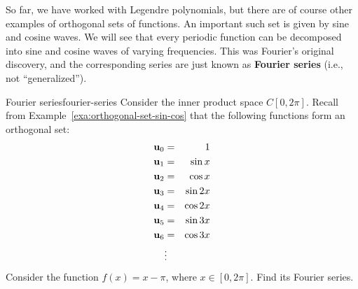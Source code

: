 So far, we have worked with Legendre polynomials, but there are of
course other examples of orthogonal sets of functions. An important
such set is given by sine and cosine waves. We will see that every
periodic function can be decomposed into sine and cosine waves of
varying frequencies. This was Fourier's original discovery, and the
corresponding series are just known as \textbf{Fourier series}%
%
 (i.e., not ``generalized'').

\begin{example}{Fourier series}{fourier-series}
  Consider the inner product space $C[0,2\pi]$. Recall from
  Example~\ref{exa:orthogonal-set-sin-cos} that the following
  functions form an orthogonal set:
  \begin{eqnarray*}
    \vect{u}_0 &=& 1 \\
    \vect{u}_1 &=& \sin x \\
    \vect{u}_2 &=& \cos x \\
    \vect{u}_3 &=& \sin 2x \\
    \vect{u}_4 &=& \cos 2x \\
    \vect{u}_5 &=& \sin 3x \\
    \vect{u}_6 &=& \cos 3x \\
    &\vdots&
  \end{eqnarray*}
  Consider the function $f(x) = x - \pi$, where $x\in[0,2\pi]$. Find
  its Fourier series.
\end{example}

